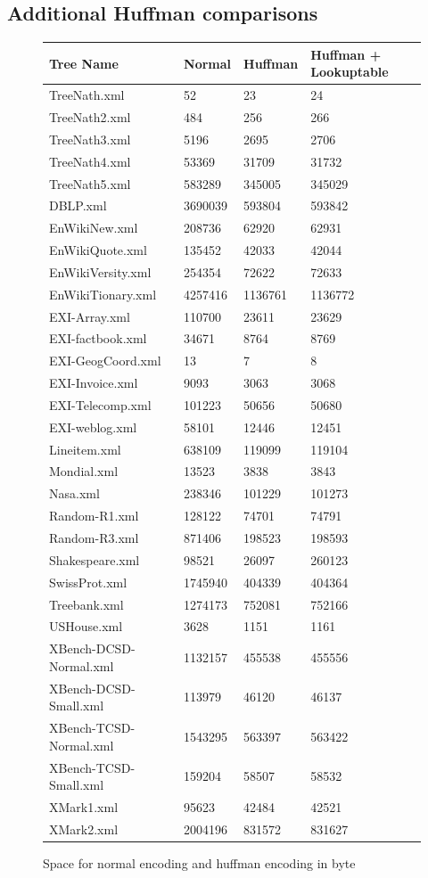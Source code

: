\documentclass{article}
\begin{document}
\subsection{Additional Huffman comparisons}
\begin{figure}[H]
	\begin{tabular}{ |p{4.5cm}||p{2cm}|p{2cm}|p{4cm}|  }
		 \hline
		 Tree Name & Normal &Huffman &Huffman + Lookuptable\\
		 \hline
		 TreeNath.xml 		&52    		&23 		&24 		\\
		 TreeNath2.xml		&484  		&256   	&266 		\\
		 TreeNath3.xml		&5196 	&2695		&2706		\\
		 TreeNath4.xml		&53369	&31709	&31732	\\
		 TreeNath5.xml		&583289	&345005	&345029	\\
		 DBLP.xml			&3690039	&593804	&593842	\\
		 EnWikiNew.xml		&208736	&62920	&62931	\\
		 EnWikiQuote.xml		&135452	&42033	&42044	\\
		 EnWikiVersity.xml		&254354	&72622	&72633	\\
		 EnWikiTionary.xml		&4257416	&1136761	&1136772	\\
		 EXI-Array.xml		&110700	&23611	&23629	\\
		 EXI-factbook.xml		&34671	&8764		&8769		\\
		 EXI-GeogCoord.xml	&13		&7		&8		\\
		 EXI-Invoice.xml		&9093		&3063		&3068		\\
		 EXI-Telecomp.xml		&101223	&50656	&50680	\\
		 EXI-weblog.xml		&58101	&12446	&12451	\\
		 Lineitem.xml			&638109	&119099	&119104	\\
		 Mondial.xml			&13523	&3838		&3843		\\
		 Nasa.xml			&238346	&101229	&101273	\\
		 Random-R1.xml		&128122	&74701	&74791	\\
		 Random-R3.xml		&871406	&198523	&198593	\\
		 Shakespeare.xml		&98521	&26097	&260123	\\
		 SwissProt.xml		&1745940	&404339	&404364	\\
		 Treebank.xml		&1274173	&752081	&752166	\\
		 USHouse.xml		&3628		&1151		&1161		\\
		 XBench-DCSD-Normal.xml	&1132157	&455538	&455556	\\
		 XBench-DCSD-Small.xml	&113979	&46120	&46137	\\
		 XBench-TCSD-Normal.xml	&1543295	&563397	&563422	\\
		 XBench-TCSD-Small.xml	&159204	&58507	&58532	\\
		 XMark1.xml			&95623	&42484	&42521	\\
		 XMark2.xml			&2004196	&831572	&831627	\\
		 \hline
	\end{tabular}
\caption{Space for normal encoding and huffman encoding in byte}
\label{huffData:table1}
\end{figure}

\pagebreak


\end{document}
